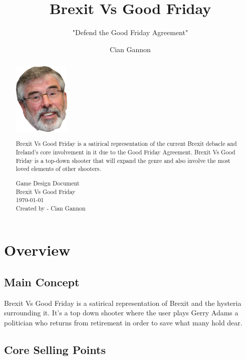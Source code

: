 \documentclass[a4paper]{scrreprt}
\title{Brexit Vs Good Friday}
\subtitle{"Defend the Good Friday Agreement"}
\author{Cian Gannon}
\begin{document}
    \maketitle

    \begin{abstract}

        \centering
        \includegraphics[width=2.7cm]{gerrylad}

        Brexit Vs Good Friday is a satirical representation of the current Brexit debacle and Ireland's core involvement in it due to the Good Friday Agreement. 
        Brexit Vs Good Friday is a top-down shooter that will expand the genre and also involve the most loved elements of other shooters.

        \begin{flushleft}
            \noindent
            \null\vfill
            Game Design Document \\
            Brexit Vs Good Friday \\
            \today \\
            Created by - Cian Gannon
        \end{flushleft}
        
    \end{abstract}

    \tableofcontents

    \chapter{Overview}

    \section{Main Concept}
    Brexit Vs Good Friday is a satirical representation of Brexit and the hysteria surrounding it. It's a top down shooter where the user plays Gerry Adams a politician who returns from retirement in order to save what many hold dear.
    
    \section{Core Selling Points}
\end{document}
